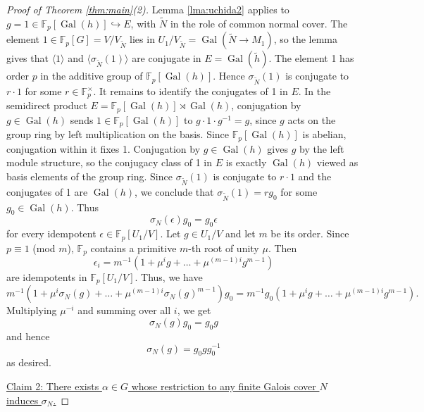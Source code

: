 \documentclass{amsart}
\theoremstyle{plain}
\theoremstyle{definition}
\theoremstyle{plain}
\theoremstyle{plain}
\theoremstyle{plain}
\theoremstyle{remark}
\theoremstyle{remark}
\theoremstyle{plain}
\theoremstyle{definition}
\theoremstyle{plain}
\DeclareMathOperator{\Gal}{\mathrm{Gal}}
\newcounter{main}
\theoremstyle{plain}
\theoremstyle{plain}
\numberwithin{equation}{section}
\begin{document}
\begin{proof}[Proof of Theorem \ref{thm:main}(2)]
Lemma \ref{lma:uchida2} applies to $g = 1 \in \mathbb{F}_p[\Gal(h)] \hookrightarrow E$, with $\widetilde{N}$ in the role of common normal cover. The element $1 \in \mathbb{F}_p[G] = V/V_{\widetilde{N}}$ lies in $U_1/V_{\widetilde{N}} = \Gal(\widetilde{N} \to M_1)$, so the lemma gives that $\langle 1 \rangle$ and $\langle \sigma_{\widetilde{N}}(1) \rangle$ are conjugate in $E = \Gal(\widetilde{h})$. The element 1 has order $p$ in the additive group of $\mathbb{F}_p[\Gal(h)]$. Hence $\sigma_{\widetilde{N}}(1)$ is conjugate to $r \cdot 1$ for some $r \in \mathbb{F}_p^\times$. It remains to identify the conjugates of 1 in $E$. In the semidirect product $E = \mathbb{F}_p[\Gal(h)] \rtimes \Gal(h)$, conjugation by $g \in \Gal(h)$ sends $1 \in \mathbb{F}_p[\Gal(h)]$ to $g \cdot 1 \cdot g^{-1} = g$, since $g$ acts on the group ring by left multiplication on the basis. Since $\mathbb{F}_p[\Gal(h)]$ is abelian, conjugation within it fixes 1. Conjugation by $g \in \Gal(h)$ gives $g$ by the left module structure, so the conjugacy class of 1 in $E$ is exactly $\Gal(h)$ viewed as basis elements of the group ring. Since $\sigma_{\widetilde{N}}(1)$ is conjugate to $r \cdot 1$ and the conjugates of 1 are $\Gal(h)$, we conclude that $\sigma_{\widetilde{N}}(1) = rg_0$ for some $g_0 \in \Gal(h)$. Thus
\begin{equation}
    \sigma_N(\epsilon)g_0 = g_0\epsilon
\end{equation}
for every idempotent $\epsilon \in \mathbb{F}_p[U_1/V]$. Let $g \in U_1/V$ and let $m$ be its order. Since $p \equiv 1$ (mod $m$), $\mathbb{F}_p$ contains a primitive $m$-th root of unity $\mu$. Then
\begin{equation}
    \epsilon_i = m^{-1}(1 + \mu^ig + \dots + \mu^{(m-1)i}g^{m-1})
\end{equation}
are idempotents in $\mathbb{F}_p[U_1/V]$. Thus, we have 
\begin{equation}
    m^{-1}(1 + \mu^i\sigma_N(g) + \dots + \mu^{(m-1)i}\sigma_N(g)^{m-1})g_0 = m^{-1}g_0(1 + \mu^ig + \dots + \mu^{(m-1)i}g^{m-1}).
\end{equation}
Multiplying $\mu^{-i}$ and summing over all $i$, we get
\begin{equation}
    \sigma_N(g)g_0 = g_0g
\end{equation}
and hence
\begin{equation}
    \sigma_N(g) = g_0gg_0^{-1}
\end{equation}
as desired.

\medskip

\underline{Claim 2: There exists $\alpha \in G$ whose restriction to any finite Galois cover $N$ induces $\sigma_N$.}


\end{proof}
\end{document}

